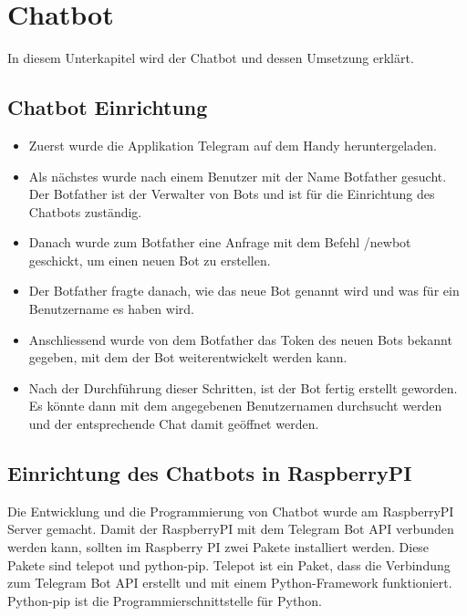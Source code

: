\section{Chatbot}
In diesem Unterkapitel wird der Chatbot und dessen Umsetzung erklärt.
\subsection{Chatbot Einrichtung}
\begin{itemize}
	\item Zuerst wurde die Applikation Telegram auf dem Handy heruntergeladen.
\end{itemize}
\begin{itemize}
	\item Als nächstes wurde nach einem Benutzer mit der Name Botfather gesucht. Der Botfather ist der Verwalter von Bots und ist für die Einrichtung des Chatbots zuständig.
\end{itemize}
\begin{itemize}
	\item Danach wurde zum Botfather eine Anfrage mit dem Befehl /newbot geschickt, um einen neuen Bot zu erstellen. 
\end{itemize}
\begin{itemize}
	\item Der Botfather fragte danach, wie das neue Bot genannt wird und was für ein Benutzername es haben wird.  
\end{itemize}
\begin{itemize}
	\item Anschliessend wurde von dem Botfather das Token des neuen Bots bekannt gegeben, mit dem der Bot weiterentwickelt werden kann. 
\end{itemize}
\begin{itemize}
	\item Nach der Durchführung dieser Schritten, ist der Bot fertig erstellt geworden. Es könnte dann mit dem angegebenen Benutzernamen durchsucht werden und der entsprechende Chat damit geöffnet werden. 
\end{itemize}
\subsection{Einrichtung des Chatbots in RaspberryPI}
Die Entwicklung und die Programmierung von Chatbot wurde am RaspberryPI Server gemacht. Damit der RaspberryPI mit dem Telegram Bot API verbunden werden kann, sollten im Raspberry PI zwei Pakete installiert werden. Diese Pakete sind telepot und python-pip. Telepot ist ein Paket, dass die Verbindung zum Telegram Bot API erstellt und mit einem Python-Framework funktioniert. Python-pip ist die Programmierschnittstelle für Python. \cite{50_telegram}
